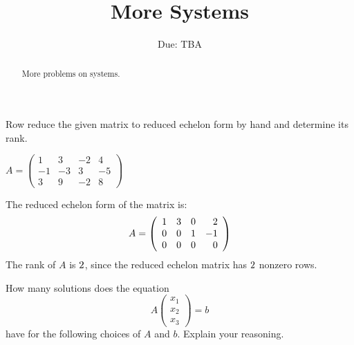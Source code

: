\documentclass{ximera}
\title{More Systems}
\author{\phantom{Dr. Golubitsky}}
\date{Due: TBA}
\begin{document}
\begin{abstract}
More problems on systems. 
\end{abstract}
\maketitle



\noindent Row reduce the given  matrix to reduced echelon form by hand and determine its rank.

\begin{exercise} %
$A=\left(\begin{array}{rrrr}
1 &  3 & -2 & 4\\
-1 &  -3 & 3 & -5\\
3 &  9 & -2 & 8
         \end{array}\right)$
       \begin{prompt}
       The reduced echelon form of the matrix is:
\[
A = \left(\begin{array}{rrrr} 1 & {3} & {0} & {2} \\ 
         0 & {0} & {1} & {-1} \\ 
         0 & 0 & {0} & {0}\end{array}\right)
\]
The rank of $A$ is ${2}$, since the reduced echelon matrix has ${2}$ nonzero
rows.         
       \end{prompt}

\end{exercise}




How many solutions does the equation
\[
A \begin{pmatrix}x_1 \\ x_2 \\ x_3\end{pmatrix} = b %
\]
have for the following choices of $A$ and $b$.  Explain your reasoning.
\end{document}
